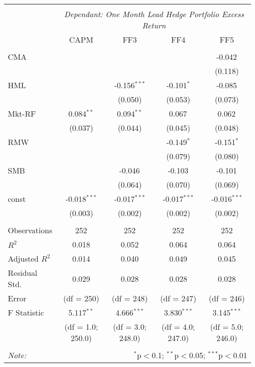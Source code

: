 \begin{table}[H] \centering
  \begin{tabular}{@{\extracolsep{5pt}}lcccc}
  \\[-1.8ex]\hline
  \hline \\[-1.8ex]
  & \multicolumn{4}{c}{\textit{Dependant: One Month Lead Hedge Portfolio Excess Return}} \
  \cr \cline{2-5}
  \\[-1.8ex] & CAPM & FF3 & FF4 & FF5 \\
  \hline \\[-1.8ex]
 CMA & & & & -0.042$^{}$ \\
  & & & & (0.118) \\
 HML & & -0.156$^{***}$ & -0.101$^{*}$ & -0.085$^{}$ \\
  & & (0.050) & (0.053) & (0.073) \\
 Mkt-RF & 0.084$^{**}$ & 0.094$^{**}$ & 0.067$^{}$ & 0.062$^{}$ \\
  & (0.037) & (0.044) & (0.045) & (0.048) \\
 RMW & & & -0.149$^{*}$ & -0.151$^{*}$ \\
  & & & (0.079) & (0.080) \\
 SMB & & -0.046$^{}$ & -0.103$^{}$ & -0.101$^{}$ \\
  & & (0.064) & (0.070) & (0.069) \\
 const & -0.018$^{***}$ & -0.017$^{***}$ & -0.017$^{***}$ & -0.016$^{***}$ \\
  & (0.003) & (0.002) & (0.002) & (0.002) \\
\hline \\[-1.8ex]
 Observations & 252 & 252 & 252 & 252 \\
 $R^2$ & 0.018 & 0.052 & 0.064 & 0.064 \\
 Adjusted $R^2$ & 0.014 & 0.040 & 0.049 & 0.045 \\
 Residual Std. & 0.029 & 0.028 & 0.028 & 0.028  \\
  Error & (df = 250) & (df = 248) & (df = 247) & (df = 246)  \\
 F Statistic & 5.117$^{**}$ & 4.666$^{***}$ & 3.830$^{***}$ & 3.145$^{***}$ \\
  & (df = 1.0; 250.0) &(df = 3.0; 248.0) & (df = 4.0; 247.0) & (df = 5.0; 246.0) \\
  \hline
  \hline \\[-1.8ex]
  \textit{Note:} & \multicolumn{4}{r}{$^{*}$p$<$0.1; $^{**}$p$<$0.05; $^{***}$p$<$0.01} \\
  \end{tabular}
  \end{table}